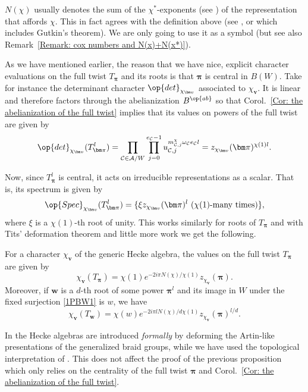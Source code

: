 \begin{rema}\label{Remark: N(x) via coexponents}
$N(\chi)$ usually denotes the sum of the $\chi^{*}$-exponents (see \cite[Chapter~4:~\S4]{lehrer-taylor-book}) of the representation that affords $\chi$. This in fact agrees with the definition above (see \cite[Prop.~4.1]{broue-michel-french-paper}, or \cite[Lemma~10.15 and Remark~10.12]{lehrer-taylor-book} which includes Gutkin's theorem). We are only going to use it as a symbol (but see also Remark~\ref{Remark: cox numbers and N(x)+N(x*)}).
\end{rema}

As we have mentioned earlier, the reason that we have nice, explicit character evaluations on the full twist $T_{\bm\pi}$ and its roots is that $\bm\pi$ is central in $B(W)$. Take for instance the determinant character $\op{det}_{\chi_{\bm v}}$ associated to $\chi_{\bm v}$. It is linear and therefore factors through the abelianization $B^{\op{ab}}$ so that Corol.~\ref{Cor: the abelianization of the full twist} implies that its values on powers of the full twist are given by 
\[
\op{det}_{\chi_{\bm v}}(T_{\bm \pi}^l)=\prod_{\mathcal{C}\in\mathcal{A}/W}\prod_{j=0}^{e_{\mathcal{C}}-1}u_{\mathcal{C},j}^{m^{\chi}_{\mathcal{C},j}\omega_{\mathcal{C}}e_{\mathcal{C}}l}=z_{\chi_{\bm v}}(\bm \pi)^{\chi(1)l}.
\]

Now, since $T_{\bm\pi}^l$ is central, it acts on irreducible representations as a scalar. That is, its spectrum is given by $$\op{Spec}_{\chi_{\bm v}}(T_{\bm\pi}^l)=\{\xi z_{\chi_{\bm v}}(\bm\pi)^l\ (\chi(1)\text{-many times})\},$$ where $\xi$ is a $\chi(1)$-th root of unity. This works similarly for roots of $T_{\bm\pi}$ and with Tits' deformation theorem and little more work we get the following.

\begin{prop}\label{Prop: character values on roots of full twist}
For a character $\chi_{\bm v}$ of the generic Hecke algebra, the values on the full twist $T_{\bm\pi}$ are given by $$ \chi_{\bm v}(T_{\bm\pi})=\chi(1)e^{-2i\pi N(\chi)/\chi(1)}z_{\chi_{\bm v}}(\bm \pi).$$
Moreover, if $\bm w$ is a $d$-th root of some power $\bm\pi^l$ and its image in $W$ under the fixed surjection \eqref{1PBW1} is $w$, we have $$\chi_{\bm v}(T_{\bm w})=\chi(w)e^{-2i\pi lN(\chi)/d\chi(1)}z_{\chi_{\bm v}}(\bm\pi)^{l/d}. $$
\end{prop}

\begin{rema}
In \cite{broue-michel-french-paper} the Hecke algebras are introduced \emph{formally} by deforming the Artin-like presentations of the generalized braid groups, while we have used the topological interpretation of \cite{broue-malle-rouquier-braid-hecke}. This does not affect the proof of the previous proposition which only relies on the centrality of the full twist $\bm\pi$ and Corol.~\ref{Cor: the abelianization of the full twist}.
\end{rema}


